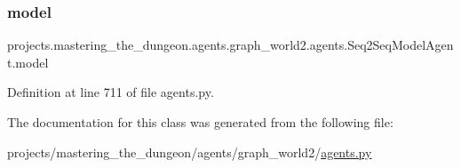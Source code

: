 \subsubsection{\texorpdfstring{model}{model}}
{\footnotesize\ttfamily projects.\+mastering\+\_\+the\+\_\+dungeon.\+agents.\+graph\+\_\+world2.\+agents.\+Seq2\+Seq\+Model\+Agent.\+model}



Definition at line 711 of file agents.\+py.



The documentation for this class was generated from the following file\+:\begin{DoxyCompactItemize}
\item 
projects/mastering\+\_\+the\+\_\+dungeon/agents/graph\+\_\+world2/\hyperlink{projects_2mastering__the__dungeon_2agents_2graph__world2_2agents_8py}{agents.\+py}\end{DoxyCompactItemize}
